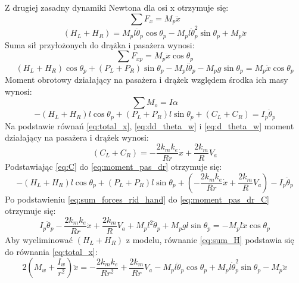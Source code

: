 Z drugiej zasadny dynamiki Newtona dla osi x otrzymuje się:
\begin{equation}
\sum F_x=M_p\ddot x
\end{equation}
\begin{equation}
(H_L+H_R)=M_pl\ddot \theta_p\cos \theta_p-M_pl\dot \theta_p^2\sin \theta_p+M_p\ddot x
\label{eq:sum_H}
\end{equation}
Suma sił przyłożonych do drążka i pasażera wynosi:
\begin{equation}
\sum F_{xp}=M_p\ddot x\cos \theta_p
\end{equation}
\begin{equation}
(H_L+H_R)\cos \theta_p+(P_L+P_R)\sin \theta_p-M_pl\ddot \theta_p-M_pg \sin \theta_p=M_p \ddot x \cos \theta_p
\label{eq:sum_forces_rid_hand}
\end{equation}
Moment obrotowy działający na pasażera i drążek względem środka ich masy wynosi:
\begin{equation}
\sum M_o=I\alpha
\end{equation}
\begin{equation}
-(H_L+H_R)l\cos \theta_p+(P_L+P_R)l\sin \theta_p+(C_L+C_R)=I_p\ddot \theta_p
\label{eq:moment_pas_dr}
\end{equation}
Na podstawie równań \eqref{eq:total_x}, \eqref{eq:dd_theta_w} i \eqref{eq:d_theta_w} moment działający na pasażera i drążek wynosi:
\begin{equation}
(C_L+C_R)=-\frac{2k_mk_e}{Rr}\dot x+\frac{2k_m}{R}V_a
\label{eq:sum_C}
\end{equation}
Podstawiając \eqref{eq:C} do \eqref{eq:moment_pas_dr} otrzymuje się:
\begin{equation}
-(H_L+H_R)l\cos \theta_p+(P_L+P_R)l\sin \theta_p+(-\frac{2k_mk_e}{Rr}\dot x+\frac{2k_m}{R}V_a)-I_p\ddot \theta_p
\label{eq:moment_pas_dr_C}
\end{equation}
Po podstawieniu \eqref{eq:sum_forces_rid_hand} do \eqref{eq:moment_pas_dr_C} otrzymuje się:
\begin{equation}
I_p\ddot \theta_p-\frac{2k_mk_e}{Rr}\dot x+\frac{2k_m}{R}V_a+M_pl^2\ddot \theta_p+M_pgl \sin \theta_p=-M_pl\ddot x\cos \theta_p
\end{equation}
Aby wyeliminować \((H_L+H_R)\) z modelu, równanie \eqref{eq:sum_H} podstawia się do równania \eqref{eq:total_x}:
\begin{equation}
2(M_w+\frac{I_w}{r^2})\ddot x=-\frac{2k_mk_e}{Rr^2}+\frac{2k_m}{Rr}V_a-M_pl\ddot \theta_p \cos \theta_p+M_pl\dot \theta_p^2\sin \theta_p-M_p\ddot x
\end{equation}
